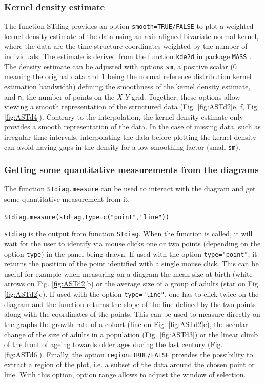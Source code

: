 \subsubsection{Kernel density estimate}
The function STdiag provides an option \texttt{smooth=TRUE/FALSE} to plot a
weighted kernel density estimate of the data using an axis-aligned bivariate
normal kernel, where the data are the time-structure coordinates weighted by the
number of individuals. The estimate is derived from the function \texttt{kde2d}
in package \texttt{MASS} \autocites{venables2002a}. The density estimate can be
adjusted with options \texttt{sm}, a positive scalar (0 meaning the original
data and 1 being the normal reference distribution kernel estimation bandwidth) defining
the smoothness of the kernel density estimate, and \texttt{n}, the number of
points on the $X$ $Y$ grid. Together, these options allow  viewing a smooth
representation of the structured data (Fig. \ref{fig:ASTd2}e, f, Fig.
\ref{fig:ASTd4}).
Contrary to the interpolation, the kernel density estimate only provides a smooth representation of the data. In
the case of missing data, such as irregular time intervals, interpolating the
data before plotting the kernel density can avoid having gaps in the density for
a low smoothing factor (small \texttt{sm}).

\subsubsection{Getting some quantitative measurements from the diagrams}

The function \texttt{STdiag.measure} can be used to interact with the diagram
and get some quantitative measurement from it.

\texttt{STdiag.measure(stdiag,type=c("point","line"))} 

\texttt{stdiag} is the output from function \texttt{STdiag}. When the function
is called, it will wait for the user to identify via mouse clicks one or two
points (depending on the option \texttt{type}) in the panel being drawn. If used
with the option \texttt{type="point"}, it returns the position of the point
identified with a single mouse click. This can be useful for example when
measuring on a diagram the mean size at birth (white arrows on Fig.
\ref{fig:ASTd2}b) or the average size of a group of adults (star on Fig.
\ref{fig:ASTd2}c). If used with the option \texttt{type="line"}, one has to
click twice on the diagram and the function returns the slope of the line
defined by the two points along with the coordinates of the points. This can be
used to measure directly on the graphs the growth rate of a cohort (line on Fig.
\ref{fig:ASTd2}c), the secular change of the size of adults in a population
(Fig. \ref{fig:ASTd3}) or the linear climb of the front of ageing towards older
ages during the last century (Fig. \ref{fig:ASTd6}). Finally, the option
\texttt{region=TRUE/FALSE} provides the possibility to extract a region of the plot, i.e. a subset of the data around
the chosen point or line.
With this option, option range allows to adjust the window of selection.

